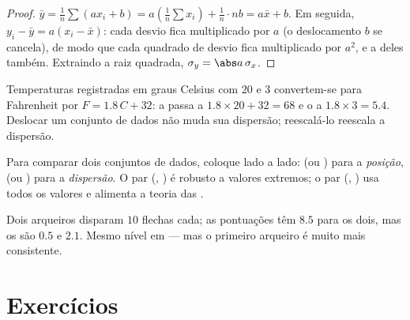 \begin{proof}
$\bar y = \frac1n \sum (a x_i + b) = a\left(\frac1n\sum x_i\right) +
\frac1n \cdot nb = a\bar x + b$. Em seguida,
$y_i - \bar y = a(x_i - \bar x)$: cada desvio fica multiplicado por $a$
(o deslocamento $b$ se cancela), de modo que cada quadrado de desvio fica
multiplicado por $a^2$, e a  deles também. Extraindo a raiz
quadrada, $\sigma_y = \abs a\,\sigma_x$.
\end{proof}

\begin{example}
Temperaturas registradas em graus Celsius com  $20$ e 
$3$ convertem-se para Fahrenheit por $F = 1.8\,C + 32$: a  passa a
$1.8 \times 20 + 32 = 68$ e o  a $1.8 \times 3 = 5.4$.
Deslocar um conjunto de dados não muda sua dispersão; reescalá-lo
reescala a dispersão.
\end{example}

\begin{method}\label{met:g11:stat:compare}
Para comparar dois conjuntos de dados, coloque lado a lado:  (ou
) para a \emph{posição},  (ou )
para a \emph{dispersão}. O par (, ) é
robusto a valores extremos; o par (, ) usa todos os
valores e alimenta a teoria das .
\end{method}

\begin{example}
Dois arqueiros disparam $10$ flechas cada; as pontuações têm  $8.5$
para os dois, mas os  são $0.5$ e $2.1$. Mesmo nível em
 --- mas o primeiro arqueiro é muito mais consistente.
\end{example}

\section{Exercícios}

